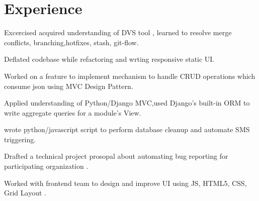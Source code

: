 \documentclass[hidelinks]{deedy-resume-openfont}
\renewcommand{\sectionsep}[0]{\vspace{8pt}}
\begin{document}
\begin{minipage}[t]{0.66\textwidth}


\section{Experience}

\vspace{\topsep} %
\begin{tightemize}
\item  Excercised acquired understanding of DVS tool , learned to resolve merge conflicts, branching,hotfixes, stash, git-flow.
\item Deflated codebase while refactoring and wrting responsive static UI.
\item  Worked on a feature to implement mechanism to handle CRUD
operations which consume json using MVC Design Pattern.
\item Applied understanding of Python/Django MVC,used Django's built-in ORM to
  write aggregate queries for a module's View.
\item wrote python/javascript script to perform database cleanup and automate SMS triggering.
\end{tightemize}
\sectionsep

\begin{tightemize}
\item Drafted a technical project prosopal about automating bug reporting
  for participating organization \href{http://code.timvideos.us/home/}{}.
\end{tightemize}
\sectionsep

\begin{tightemize}
\item Worked with frontend team to design and improve UI using JS, HTML5, CSS, Grid Layout .
\end{tightemize}
\sectionsep


\end{minipage}
\end{document}
